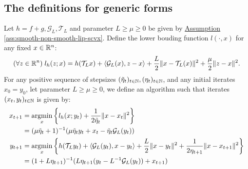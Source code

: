 \documentclass[12pt]{article}
\begin{document}
    \subsection{The definitions for generic forms}
        \newcommand{\SCPPMAPG}{SC PPM APG }
        \begin{definition}[\SCPPMAPG]\label{def:SC-PPM-APG}
            
            Let $h = f + g, \mathcal G_L, \mathcal T_L$ and parameter $L \ge \mu \ge 0$ be given by
            \hyperref[ass:smooth-non-smooth-lip-scvx]
            {Assumption \ref*{ass:smooth-non-smooth-lip-scvx}}. 
            Define the lower bouding function $l(\cdot, x)$ for any fixed $x \in \mathbb R^n$: 
            \begin{align*}
                (\forall z \in \mathbb R^n) \; l_h(z; x) = h(\mathcal T_L x) + \langle \mathcal G_L (x), z - x\rangle
                + 
                \frac{L}{2}\Vert x - \mathcal T_L (x)\Vert^2 + \frac{\mu}{2}\Vert z - x\Vert^2. 
            \end{align*}
            For any positive sequence of stepsizes $(\tilde \eta_t)_{t \in \mathbb N}, (\eta_t)_{t \in \mathbb N}$, and any initial iterates $x_0 = y_0$, let parameter $L \ge \mu \ge 0$, we define an algorithm such that iterates $(x_t, y_t)_{t \in \mathbb N}$ is given by: 
            \begin{align*}
                x_{t + 1} &= \mathop{\rm argmin}\limits_{x} \left\lbrace
                l_h(x; y_t) + \frac{1}{2\tilde \eta_{t}} 
                \Vert x - x_t\Vert^2
                \right\rbrace
                \\
                &= (\mu\tilde \eta_{t} + 1)^{-1} 
                (\mu\tilde \eta_{t}y_t + x_t - \tilde \eta_{t}\mathcal G_L(y_t))
                \\
                y_{t + 1}&= 
                \mathop{\rm argmin}\limits_{x}
                \left\lbrace
                    h(\mathcal T_L y_t) + \langle \mathcal G_L(y_t), x - y_t\rangle + \frac{L}{2}\Vert x -y_t\Vert^2
                    + \frac{1}{2\eta_{t + 1}}\Vert x - x_{t + 1}\Vert^2
                \right\rbrace
                \\
                &= (1 + L \eta_{t +1})^{-1}(L\eta_{t + 1}(y_t - L^{-1}\mathcal G_L(y_t)) + x_{t + 1})
            \end{align*}
        \end{definition}
\end{document}
